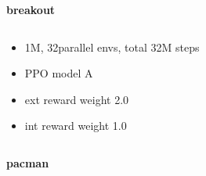 \documentclass[xcolor=dvipsnames]{beamer}
\begin{document}
\begin{frame}{\bf breakout}
\begin{columns}
      \begin{column}{0.5\textwidth}
        \begin{itemize}
          \item 1M, 32parallel envs, total 32M steps
          \item PPO model A
          \item ext reward weight 2.0
          \item int reward weight 1.0
        \end{itemize}
      \end{column}

  \end{columns}

\end{frame}


\begin{frame}{\bf pacman}

  \begin{columns}


\end{columns}
\end{frame}
\end{document}
